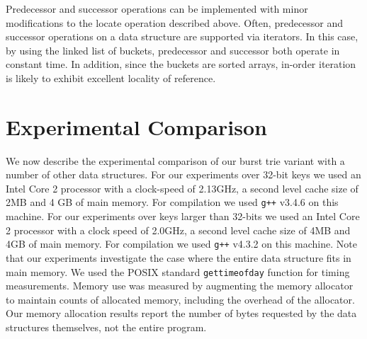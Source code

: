 \documentclass[]{acmtrans2m}
\begin{document}
Predecessor and successor operations can be implemented with minor modifications
to the locate operation described above. Often, 
predecessor and successor operations on a data structure are supported via
iterators. In this case, by using the linked list of buckets, predecessor
and successor both operate in constant time. In addition, since the buckets
are sorted arrays, in-order iteration is likely to exhibit excellent locality
of reference.

\section{Experimental Comparison}
\label{exp_comparison}

We now describe the experimental comparison of our burst trie variant with a number of other data structures.
For our experiments over 32-bit keys we used an Intel Core 2 processor with a clock-speed of 2.13GHz, a second level
cache size of 2MB and 4 GB of main memory. For compilation we used \texttt{g++} v3.4.6 on this machine.
For our experiments over keys larger than 32-bits we used an Intel Core 2 processor 
with a clock speed of 2.0GHz, a second level cache size of 4MB and 4GB of main memory. For compilation we used
\texttt{g++} v4.3.2 on this machine. Note that our experiments
investigate the case where the entire data structure fits in main memory. 
We used the POSIX standard \texttt{gettimeofday} function for timing measurements. Memory use was measured
by augmenting the memory allocator to maintain counts of allocated memory, including the overhead of the allocator.
Our memory allocation results report the number of bytes requested by the data structures themselves, not the entire
program.
\end{document}
